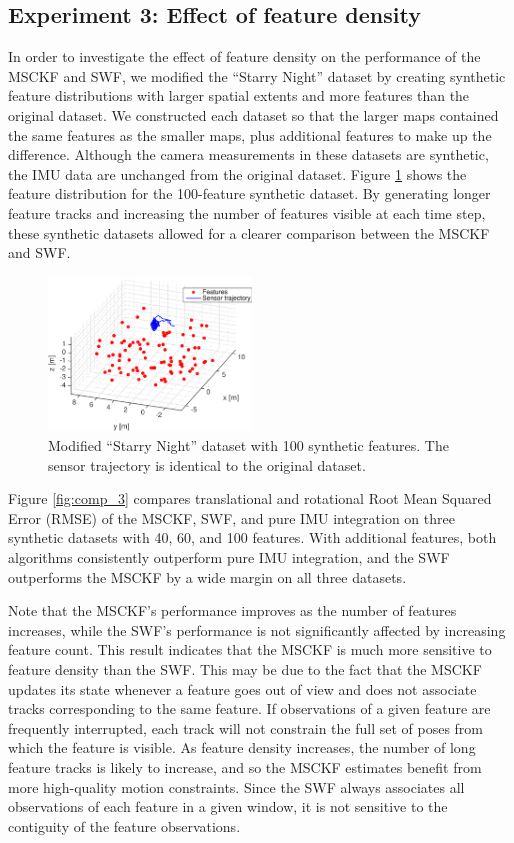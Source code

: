 \documentclass[letterpaper, 10 pt, conference]{ieeeconf}  %
\begin{document}
\subsection{Experiment 3: Effect of feature density}
In order to investigate the effect of feature density on the performance of the MSCKF and SWF, we modified the ``Starry Night'' dataset by creating synthetic feature distributions with larger spatial extents and more features than the original dataset.
We constructed each dataset so that the larger maps contained the same features as the smaller maps, plus additional features to make up the difference.
Although the camera measurements in these datasets are synthetic, the IMU data are unchanged from the original dataset.
Figure \ref{fig:trajectory_groundtruth_100lessnoisy} shows the feature distribution for the 100-feature synthetic dataset.
By generating longer feature tracks and increasing the number of features visible at each time step, these synthetic datasets allowed for a clearer comparison between the MSCKF and SWF.

\begin{figure}
    \centering
    \includegraphics[width=0.48\textwidth]{figs/trajectory_groundtruth_100lessnoisy}
    \caption{Modified ``Starry Night'' dataset with 100 synthetic features. The sensor trajectory is identical to the original dataset.}
    \label{fig:trajectory_groundtruth_100lessnoisy}
\end{figure}

Figure \ref{fig:comp_3} compares translational and rotational Root Mean Squared Error (RMSE) of the MSCKF, SWF, and pure IMU integration on three synthetic datasets with 40, 60, and 100 features.
With additional features, both algorithms consistently outperform pure IMU integration, and the SWF outperforms the MSCKF by a wide margin on all three datasets.

Note that the MSCKF's performance improves as the number of features increases, while the SWF's performance is not significantly affected by increasing feature count.
This result indicates that the MSCKF is much more sensitive to feature density than the SWF.
This may be due to the fact that the MSCKF updates its state whenever a feature goes out of view and does not associate tracks corresponding to the same feature.
If observations of a given feature are frequently interrupted, each track will not constrain the full set of poses from which the feature is visible.
As feature density increases, the number of long feature tracks is likely to increase, and so the MSCKF estimates benefit from more high-quality motion constraints.
Since the SWF always associates all observations of each feature in a given window, it is not sensitive to the contiguity of the feature observations.
\end{document}
